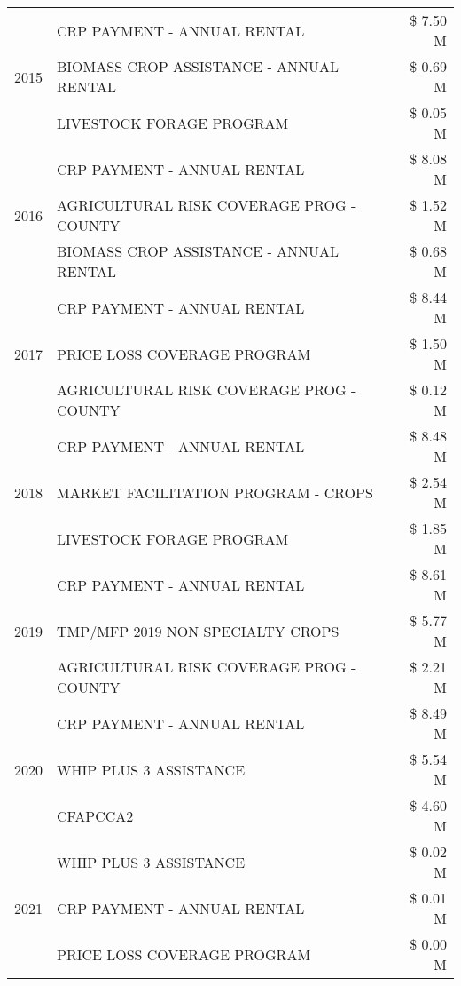 \begin{tabular}{llr}
\cline{1-3}
\multirow[t]{3}{*}{2015} & CRP PAYMENT - ANNUAL RENTAL & \$ 7.50 M \\
 & BIOMASS CROP ASSISTANCE - ANNUAL RENTAL & \$ 0.69 M \\
 & LIVESTOCK FORAGE PROGRAM & \$ 0.05 M \\
\cline{1-3}
\multirow[t]{3}{*}{2016} & CRP PAYMENT - ANNUAL RENTAL & \$ 8.08 M \\
 & AGRICULTURAL RISK COVERAGE PROG - COUNTY & \$ 1.52 M \\
 & BIOMASS CROP ASSISTANCE - ANNUAL RENTAL & \$ 0.68 M \\
\cline{1-3}
\multirow[t]{3}{*}{2017} & CRP PAYMENT - ANNUAL RENTAL & \$ 8.44 M \\
 & PRICE LOSS COVERAGE PROGRAM & \$ 1.50 M \\
 & AGRICULTURAL RISK COVERAGE PROG - COUNTY & \$ 0.12 M \\
\cline{1-3}
\multirow[t]{3}{*}{2018} & CRP PAYMENT - ANNUAL RENTAL & \$ 8.48 M \\
 & MARKET FACILITATION PROGRAM - CROPS & \$ 2.54 M \\
 & LIVESTOCK FORAGE PROGRAM & \$ 1.85 M \\
\cline{1-3}
\multirow[t]{3}{*}{2019} & CRP PAYMENT - ANNUAL RENTAL & \$ 8.61 M \\
 & TMP/MFP 2019 NON SPECIALTY CROPS & \$ 5.77 M \\
 & AGRICULTURAL RISK COVERAGE PROG - COUNTY & \$ 2.21 M \\
\cline{1-3}
\multirow[t]{3}{*}{2020} & CRP PAYMENT - ANNUAL RENTAL & \$ 8.49 M \\
 & WHIP PLUS 3 ASSISTANCE & \$ 5.54 M \\
 & CFAPCCA2 & \$ 4.60 M \\
\cline{1-3}
\multirow[t]{3}{*}{2021} & WHIP PLUS 3 ASSISTANCE & \$ 0.02 M \\
 & CRP PAYMENT - ANNUAL RENTAL & \$ 0.01 M \\
 & PRICE LOSS COVERAGE PROGRAM & \$ 0.00 M \\
\cline{1-3}
\bottomrule
\end{tabular}
